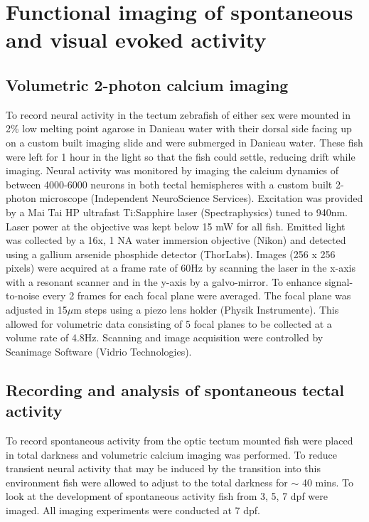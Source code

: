 \section{Functional imaging of spontaneous and visual evoked activity}
\subsection{Volumetric 2-photon calcium imaging}
To record neural activity in the tectum zebrafish of either sex were mounted in 2\% low melting point agarose in Danieau water with their dorsal side facing up on a custom built imaging slide and were submerged in Danieau water. These fish were left for 1 hour in the light so that the fish could settle, reducing drift while imaging. Neural activity was monitored by imaging the calcium dynamics of between 4000-6000  neurons in both tectal hemispheres with a custom built 2-photon microscope (Independent NeuroScience Services). Excitation was provided by a Mai Tai HP ultrafast Ti:Sapphire laser (Spectraphysics) tuned to 940nm. Laser power at the objective was kept below 15 mW for all fish. Emitted light was collected by a 16x, 1 NA water immersion objective (Nikon) and detected using a gallium arsenide phosphide detector (ThorLabs). Images (256 x 256 pixels) were acquired at a frame rate of 60Hz by scanning the laser in the x-axis with a resonant scanner and in the y-axis by a galvo-mirror. To enhance signal-to-noise every 2 frames for each focal plane were averaged. The focal plane was adjusted in 15$\mu$m steps using a piezo lens holder (Physik Instrumente). This allowed for volumetric data consisting of 5 focal planes to be collected at a volume rate of 4.8Hz. Scanning and image acquisition were controlled by Scanimage Software (Vidrio Technologies).

\subsection{Recording and analysis of spontaneous tectal activity}
To record spontaneous activity from the optic tectum mounted fish were placed in total darkness and volumetric calcium imaging was performed. To reduce transient neural activity that may be induced by the transition into this environment fish were allowed to adjust to the total darkness for $\sim$ 40 mins. To look at the development of spontaneous activity fish from 3, 5, 7 \gls{dpf} were imaged. All imaging experiments were conducted at 7 dpf.


\clearpage
